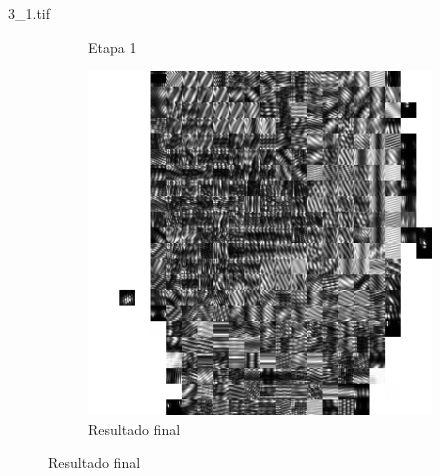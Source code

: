 \documentclass{beamer}
\begin{document}
\begin{frame}{3\_1.tif}
\begin{figure}
\begin{subfigure}[!ht]{0.32\textwidth}
                \caption{Etapa 1}
            \end{subfigure}
            \begin{subfigure}[!ht]{0.32\textwidth}
                \includegraphics[width=\columnwidth]{Fingerprints/3_1_final.jpg}
                \caption{Resultado final}
            \end{subfigure}
        \end{figure}
    \end{frame}
\end{document}

